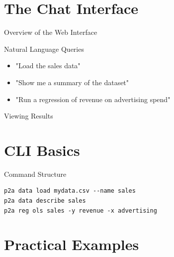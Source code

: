 \documentclass[aspectratio=169]{beamer}
\begin{document}
\section{The Chat Interface}

\begin{frame}{Overview of the Web Interface}
\end{frame}

\begin{frame}{Natural Language Queries}
    \begin{itemize}
        \item "Load the sales data"
        \item "Show me a summary of the dataset"
        \item "Run a regression of revenue on advertising spend"
    \end{itemize}
\end{frame}

\begin{frame}{Viewing Results}
\end{frame}

\section{CLI Basics}

\begin{frame}[fragile]{Command Structure}
    \begin{lstlisting}
p2a data load mydata.csv --name sales
p2a data describe sales
p2a reg ols sales -y revenue -x advertising
    \end{lstlisting}
\end{frame}

\section{Practical Examples}
\end{document}
